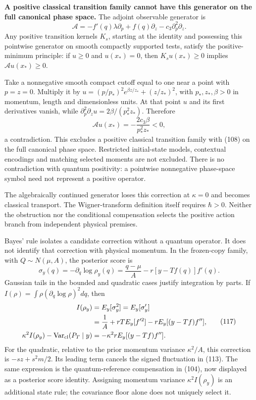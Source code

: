 \documentclass[11pt,a4paper]{article}
\begin{document}
\textbf{A positive classical transition family cannot have this
generator on the full canonical phase space.} The adjoint observable
generator is \[\mathcal A=-f'(q)\lambda\partial_p+f(q)\partial_z
                         -c_3\partial_p^2\partial_z.\tag{108}\] Any
positive transition kernels \(K_s\), starting at the identity and
possessing this pointwise generator on smooth compactly supported tests,
satisfy the positive-minimum principle: if \(u\ge0\) and \(u(x_*)=0\),
then \(K_su(x_*)\ge0\) implies \(\mathcal Au(x_*)\ge0\).

Take a nonnegative smooth compact cutoff equal to one near a point with
\(p=z=0\). Multiply it by \(u=(p/p_*)^2e^{\beta z/z_*}+(z/z_*)^2\), with
\(p_*,z_*,\beta>0\) in momentum, length and dimensionless units. At that
point \(u\) and its first derivatives vanish, while
\(\partial_p^2\partial_z u=2\beta/(p_*^2z_*)\). Therefore
\[\mathcal Au(x_*)=-\frac{2c_3\beta}{p_*^2z_*}<0,\tag{109}\] a
contradiction. This excludes a positive classical transition family with
(108) on the full canonical phase space. Restricted initial-state
models, contextual encodings and matching selected moments are not
excluded. There is no contradiction with quantum positivity: a pointwise
nonnegative phase-space symbol need not represent a positive operator.

The algebraically continued generator loses this correction at
\(\kappa=0\) and becomes classical transport. The Wigner-transform
definition itself requires \(\hbar>0\). Neither the obstruction nor the
conditional compensation selects the positive action branch from
independent physical premises.

Bayes' rule isolates a candidate correction without a quantum operator.
It does not identify that correction with physical momentum. In the
frozen-copy family, with \(Q\sim N(\mu,A)\), the posterior score is
\[\sigma_y(q)=-\partial_q\log\rho_y(q)
 =\frac{q-\mu}{A}-r[y-Tf(q)]f'(q).\] Gaussian tails in the bounded and
quadratic cases justify integration by parts. If
\(I(\rho)=\int\rho(\partial_q\log\rho)^2dq\), then \[\begin{aligned}
I(\rho_y)&=E_y[\sigma_y^2]=E_y[\sigma_y']\\
 &=\frac1A+rT E_y[f'^2]-rE_y[(y-Tf)f''],\\
\kappa^2 I(\rho_y)-\operatorname{Var}_{\rm cl}(P_T\mid y)
 &=-\kappa^2rE_y[(y-Tf)f''].
\end{aligned}\tag{117}\] For the quadratic, relative to the prior
momentum variance \(\kappa^2/A\), this correction is \(-sz+s^2m/2\). Its
leading term cancels the signed fluctuation in (113). The same
expression is the quantum-reference compensation in (104), now displayed
as a posterior score identity. Assigning momentum variance
\(\kappa^2I(\rho_y)\) is an additional state rule; the covariance floor
alone does not uniquely select it.
\end{document}
